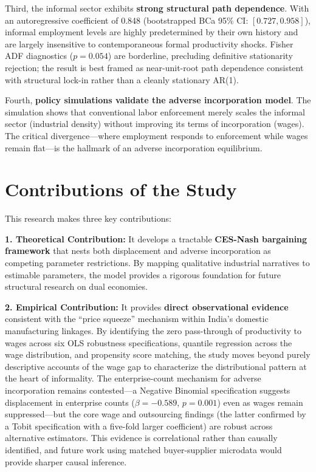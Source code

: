 Third, the informal sector exhibits \textbf{strong structural path dependence}. With an autoregressive coefficient of 0.848 (bootstrapped BCa 95\% CI: $[0.727, 0.958]$), informal employment levels are highly predetermined by their own history and are largely insensitive to contemporaneous formal productivity shocks. Fisher ADF diagnostics ($p = 0.054$) are borderline, precluding definitive stationarity rejection; the result is best framed as near-unit-root path dependence consistent with structural lock-in rather than a cleanly stationary AR(1).

Fourth, \textbf{policy simulations validate the adverse incorporation model}. The simulation shows that conventional labor enforcement merely scales the informal sector (industrial density) without improving its terms of incorporation (wages). The critical divergence—where employment responds to enforcement while wages remain flat—is the hallmark of an adverse incorporation equilibrium.

\section{Contributions of the Study}
\label{sec:contributions}

This research makes three key contributions:

\textbf{1. Theoretical Contribution:} It develops a tractable \textbf{CES-Nash bargaining framework} that nests both displacement and adverse incorporation as competing parameter restrictions. By mapping qualitative industrial narratives to estimable parameters, the model provides a rigorous foundation for future structural research on dual economies.

\textbf{2. Empirical Contribution:} It provides \textbf{direct observational evidence} consistent with the ``price squeeze'' mechanism within India's domestic manufacturing linkages. By identifying the zero pass-through of productivity to wages across six OLS robustness specifications, quantile regression across the wage distribution, and propensity score matching, the study moves beyond purely descriptive accounts of the wage gap to characterize the distributional pattern at the heart of informality. The enterprise-count mechanism for adverse incorporation remains contested---a Negative Binomial specification suggests displacement in enterprise counts ($\beta = -0.589$, $p = 0.001$) even as wages remain suppressed---but the core wage and outsourcing findings (the latter confirmed by a Tobit specification with a five-fold larger coefficient) are robust across alternative estimators. This evidence is correlational rather than causally identified, and future work using matched buyer-supplier microdata would provide sharper causal inference.

